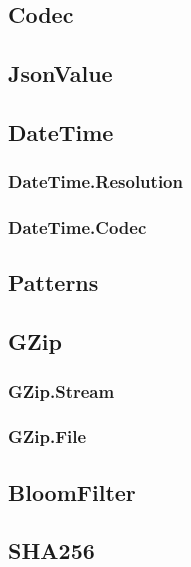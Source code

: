 \documentclass{article}
\begin{document}
\subsection{Codec}

\subsection{JsonValue}

\subsection{DateTime}

\subsubsection{DateTime.Resolution}

\subsubsection{DateTime.Codec}

\subsection{Patterns}

\subsection{GZip}

\subsubsection{GZip.Stream}

\subsubsection{GZip.File}

\subsection{BloomFilter}

\subsection{SHA256}


\clearpage
\appendix
\end{document}
